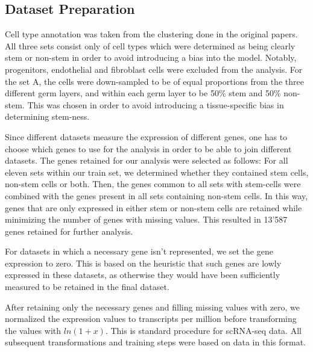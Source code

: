 \documentclass[10pt,conference,compsocconf]{IEEEtran}
\begin{document}
\subsection{Dataset Preparation}
Cell type annotation was taken from the clustering done in the original papers. All three sets consist only of cell types which were determined as being clearly stem or non-stem in order to avoid introducing a bias into the model. Notably, progenitors, endothelial and fibroblast cells were excluded from the analysis. For the set A, the cells were down-sampled to be of equal proportions from the three different germ layers, and within each germ layer to be 50\% stem and 50\% non-stem. This was chosen in order to avoid introducing a tissue-specific bias in determining stem-ness. 
\par
Since different datasets measure the expression of different genes, one has to choose which genes to use for the analysis in order to be able to join different datasets. The genes retained for our analysis were selected as follows: For all eleven sets within our train set, we determined whether they contained stem cells, non-stem cells or both. Then, the genes common to all sets with stem-cells were combined with the genes present in all sets containing non-stem cells. In this way, genes that are only expressed in either stem or non-stem cells are retained while minimizing the number of genes with missing values. This resulted in 13'587 genes retained for further analysis.
\par
For datasets in which a necessary gene isn't represented, we set the gene expression to zero. This is based on the heuristic that such genes are lowly expressed in these datasets, as otherwise they would have been sufficiently measured to be retained in the final dataset. 
\par
After retaining only the necessary genes and filling missing values with zero, we normalized the expression values to transcripts per million before transforming the values with $ln(1+x)$. This is standard procedure for scRNA-seq data. All subsequent transformations and training steps were based on data in this format. 
\end{document}
